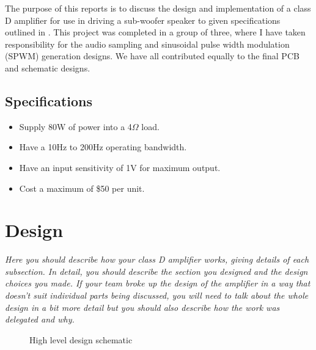 \documentclass[a4paper,11pt]{article}
\begin{document}
The purpose of this reports is to discuss the design and implementation of a class D amplifier for use in driving a sub-woofer speaker to given specifications outlined in . This project was completed in a group of three, where I have taken responsibility for the audio sampling and sinusoidal pulse width modulation (SPWM) generation designs. We have all contributed equally to the final PCB and schematic designs. 

\subsection{Specifications}\label{S:specs}

\begin{itemize}
    \item Supply 80W of power into a 4$\Omega$ load.
    \item Have a 10Hz to 200Hz operating bandwidth.
    \item Have an input sensitivity of 1V for maximum output.
    \item Cost a maximum of \$50 per unit.
\end{itemize}

\section{Design}

\textit{Here you should describe how your class D amplifier works, giving details of each subsection. In detail, you should describe the section you designed and the design choices you made. If your team broke up the design of the amplifier in a way that doesn’t suit individual parts being discussed, you will need to talk about the whole design in a bit more detail but you should also describe how the work was delegated and why.}

\begin{figure}[h!]
    \centering
    \caption{High level design schematic}
\end{figure}
\end{document}
